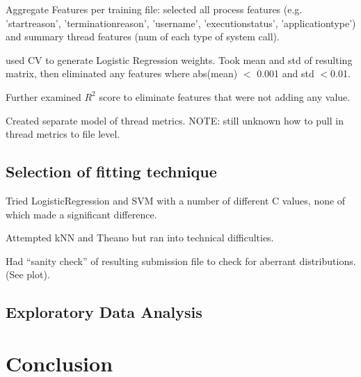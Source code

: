 \documentclass[11pt, oneside]{article}   	%
\begin{document}
Aggregate Features per training file:
 selected all process features  (e.g. 'startreason', 'terminationreason', 'username', 'executionstatus', 'applicationtype') and summary thread features (num of each type of system call).

used CV to generate Logistic Regression weights. Took mean and std of resulting matrix, then eliminated any features where abs(mean) $<$ 0.001 and std $< $0.01.

Further examined $R^2$ score to eliminate features that were not adding any value.

Created separate model of thread metrics. NOTE: still unknown how to pull in thread metrics to file level.

\subsection*{Selection of fitting technique}

Tried LogisticRegression and SVM with a number of different C values, none of which made a significant difference.

Attempted kNN and Theano but ran into technical difficulties.

Had ``sanity check'' of resulting submission file to check for aberrant distributions. (See plot).

\subsection*{Exploratory Data Analysis}

\section*{Conclusion}
\end{document}
